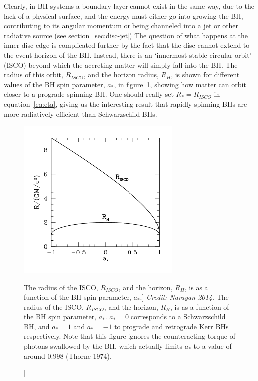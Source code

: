 Clearly, in BH systems a boundary layer cannot exist in the same way,
due to the lack of a physical surface, and the energy must either go into
growing the BH, contributing to its angular momentum or being
channeled into a jet or other radiative source (see section~\ref{sec:disc-jet})
The question of what happens at the inner disc edge
is complicated further by the fact that the disc cannot extend to the 
event horizon of the BH. Instead, there is an `innermost stable circular orbit' (ISCO)
beyond which the accreting matter will simply fall into the BH. The radius
of this orbit, $R_{ISCO}$, and the horizon radius, $R_H$,
is shown for different values of the BH spin parameter, $a_*$, 
in figure~\ref{fig:isco}, showing how matter can orbit closer to a prograde spinning BH. 
One should really set $R_* = R_{ISCO}$ in equation~\ref{eq:eta}, giving us the interesting
result that rapidly spinning BHs are more radiatively efficient 
than Schwarzschild BHs.

\nocite{narayan2014, thorne1974}
\begin{figure}
\centering
\includegraphics[width=0.7\textwidth]{figures/01-intro/isco.png}
\caption
[The radius of the ISCO, $R_{ISCO}$, and the horizon, $R_H$,
is as a function of the BH spin parameter, $a_*$.]
{
{\sl Credit: Narayan 2014.}
The radius of the ISCO, $R_{ISCO}$, and the horizon, $R_H$,
is as a function of the BH spin parameter, $a_*$. 
$a_*=0$ corresponds to a Schwarzschild BH, and $a_*=1$ and $a_*=-1$
to prograde and retrograde Kerr BHs respectively. Note that
this figure ignores the counteracting torque of photons swallowed by the BH,
which actually limits $a_*$ to a value of around $0.998$ (Thorne 1974).  
} 
\label{fig:isco}
\end{figure}



